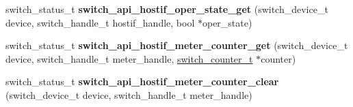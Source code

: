 \begin{DoxyCompactItemize}
\item 
\hypertarget{group__HostInterface_gadc216bbf9d071055faa618a5f8324a63}{switch\+\_\+status\+\_\+t {\bfseries switch\+\_\+api\+\_\+hostif\+\_\+oper\+\_\+state\+\_\+get} (switch\+\_\+device\+\_\+t device, switch\+\_\+handle\+\_\+t hostif\+\_\+handle, bool $\ast$oper\+\_\+state)}\label{group__HostInterface_gadc216bbf9d071055faa618a5f8324a63}

\item 
\hypertarget{group__HostInterface_gabdc2654c7a32ca7606c4f59faa746d80}{switch\+\_\+status\+\_\+t {\bfseries switch\+\_\+api\+\_\+hostif\+\_\+meter\+\_\+counter\+\_\+get} (switch\+\_\+device\+\_\+t device, switch\+\_\+handle\+\_\+t meter\+\_\+handle, \hyperlink{structswitch__counter__s}{switch\+\_\+counter\+\_\+t} $\ast$counter)}\label{group__HostInterface_gabdc2654c7a32ca7606c4f59faa746d80}

\item 
\hypertarget{group__HostInterface_gaa75fcee70189d90ce1e1113c8337e1c0}{switch\+\_\+status\+\_\+t {\bfseries switch\+\_\+api\+\_\+hostif\+\_\+meter\+\_\+counter\+\_\+clear} (switch\+\_\+device\+\_\+t device, switch\+\_\+handle\+\_\+t meter\+\_\+handle)}\label{group__HostInterface_gaa75fcee70189d90ce1e1113c8337e1c0}

\end{DoxyCompactItemize}


